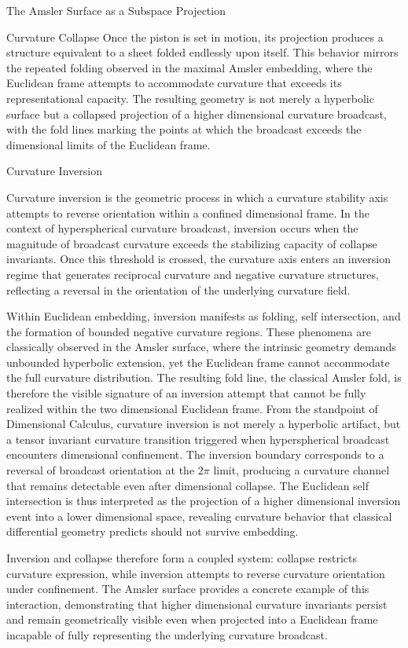 \documentclass[final,onefignum,onetabnum]{siamart}
\begin{document}
\begin{section}{The Amsler Surface as a Subspace Projection}
\begin{subsection}{Curvature Collapse}
Once the piston is set in motion, its projection produces a structure equivalent to a sheet folded endlessly upon itself. This behavior mirrors the repeated folding observed in the maximal Amsler embedding, where the Euclidean frame attempts to accommodate curvature that exceeds its representational capacity. The resulting geometry is not merely a hyperbolic surface but a collapsed projection of a higher dimensional curvature broadcast, with the fold lines marking the points at which the broadcast exceeds the dimensional limits of the Euclidean frame.
\end{subsection}

\begin{subsection}{Curvature Inversion}

Curvature inversion is the geometric process in which a curvature stability axis attempts to reverse orientation within a confined dimensional frame. In the context of hyperspherical curvature broadcast, inversion occurs when the magnitude of broadcast curvature exceeds the stabilizing capacity of collapse invariants. Once this threshold is crossed, the curvature axis enters an inversion regime that generates reciprocal curvature and negative curvature structures, reflecting a reversal in the orientation of the underlying curvature field.

Within Euclidean embedding, inversion manifests as folding, self intersection, and the formation of bounded negative curvature regions. These phenomena are classically observed in the Amsler surface, where the intrinsic geometry demands unbounded hyperbolic extension, yet the Euclidean frame cannot accommodate the full curvature distribution. The resulting fold line, the classical Amsler fold, is therefore the visible signature of an inversion attempt that cannot be fully realized within the two dimensional Euclidean frame. From the standpoint of Dimensional Calculus, curvature inversion is not merely a hyperbolic artifact, but a tensor invariant curvature transition triggered when hyperspherical broadcast encounters dimensional confinement. The inversion boundary corresponds to a reversal of broadcast orientation at the $2\pi$ limit, producing a curvature channel that remains detectable even after dimensional collapse. The Euclidean self intersection is thus interpreted as the projection of a higher dimensional inversion event into a lower dimensional space, revealing curvature behavior that classical differential geometry predicts should not survive embedding.

Inversion and collapse therefore form a coupled system: collapse restricts curvature expression, while inversion attempts to reverse curvature orientation under confinement. The Amsler surface provides a concrete example of this interaction, demonstrating that higher dimensional curvature invariants persist and remain geometrically visible even when projected into a Euclidean frame incapable of fully representing the underlying curvature broadcast.
\end{subsection}


\end{section}
\end{document}
